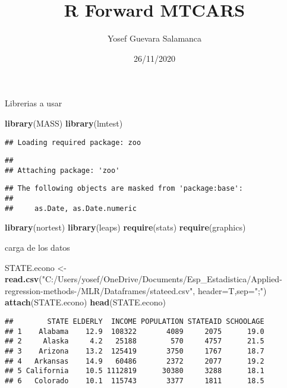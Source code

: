 \documentclass[
]{article}
\title{R Forward MTCARS}
\author{Yosef Guevara Salamanca}
\date{26/11/2020}
\newenvironment{Shaded}{\begin{snugshade}}{\end{snugshade}}
\newcommand{\DataTypeTok}[1]{\textcolor[rgb]{0.13,0.29,0.53}{#1}}
\newcommand{\KeywordTok}[1]{\textcolor[rgb]{0.13,0.29,0.53}{\textbf{#1}}}
\newcommand{\NormalTok}[1]{#1}
\newcommand{\StringTok}[1]{\textcolor[rgb]{0.31,0.60,0.02}{#1}}
\begin{document}
\maketitle

Librerias a usar

\begin{Shaded}
\begin{Highlighting}[]
\KeywordTok{library}\NormalTok{(MASS)}
\KeywordTok{library}\NormalTok{(lmtest)}
\end{Highlighting}
\end{Shaded}

\begin{verbatim}
## Loading required package: zoo
\end{verbatim}

\begin{verbatim}
## 
## Attaching package: 'zoo'
\end{verbatim}

\begin{verbatim}
## The following objects are masked from 'package:base':
## 
##     as.Date, as.Date.numeric
\end{verbatim}

\begin{Shaded}
\begin{Highlighting}[]
\KeywordTok{library}\NormalTok{(nortest)}
\KeywordTok{library}\NormalTok{(leaps)}
\KeywordTok{require}\NormalTok{(stats)}
\KeywordTok{require}\NormalTok{(graphics)}
\end{Highlighting}
\end{Shaded}

carga de los datos

\begin{Shaded}
\begin{Highlighting}[]
\NormalTok{STATE.econo <-}\StringTok{ }\KeywordTok{read.csv}\NormalTok{(}\StringTok{"C:/Users/yosef/OneDrive/Documents/Esp_Estadistica/Applied-regression-methods-/MLR/Dataframes/stateed.csv"}\NormalTok{, }\DataTypeTok{header=}\NormalTok{T,}\DataTypeTok{sep=}\StringTok{";"}\NormalTok{)}
\KeywordTok{attach}\NormalTok{(STATE.econo)}
\KeywordTok{head}\NormalTok{(STATE.econo)}
\end{Highlighting}
\end{Shaded}

\begin{verbatim}
##        STATE ELDERLY  INCOME POPULATION STATEAID SCHOOLAGE
## 1    Alabama    12.9  108322       4089     2075      19.0
## 2     Alaska     4.2   25188        570     4757      21.5
## 3    Arizona    13.2  125419       3750     1767      18.7
## 4   Arkansas    14.9   60486       2372     2077      19.2
## 5 California    10.5 1112819      30380     3288      18.1
## 6   Colorado    10.1  115743       3377     1811      18.5
\end{verbatim}
\end{document}
